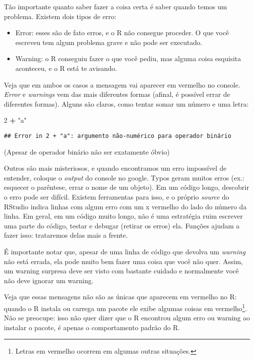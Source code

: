 \documentclass[
]{book}
\newenvironment{Shaded}{\begin{snugshade}}{\end{snugshade}}
\newcommand{\DecValTok}[1]{\textcolor[rgb]{0.00,0.00,0.81}{#1}}
\newcommand{\OperatorTok}[1]{\textcolor[rgb]{0.81,0.36,0.00}{\textbf{#1}}}
\newcommand{\StringTok}[1]{\textcolor[rgb]{0.31,0.60,0.02}{#1}}
\providecommand{\tightlist}{%
  \setlength{\itemsep}{0pt}\setlength{\parskip}{0pt}}
\begin{document}
Tão importante quanto saber fazer a coisa certa é saber quando temos um problema. Existem dois tipos de erro:

\begin{itemize}
\tightlist
\item
  Error: esses são de fato erros, e o R não consegue proceder. O que você escreveu tem algum problema grave e não pode ser executado.
\item
  Warning: o R conseguiu fazer o que você pediu, mas alguma coisa esquisita aconteceu, e o R está te avisando.
\end{itemize}

Veja que em ambos os casos a mensagem vai aparecer em vermelho no console. \emph{Error} e \emph{warnings} vem das mais diferentes formas (afinal, é possível errar de diferentes formas). Alguns são claros, como tentar somar um número e uma letra:

\begin{Shaded}
\begin{Highlighting}[]
\DecValTok{2} \OperatorTok{+}\StringTok{ "a"}
\end{Highlighting}
\end{Shaded}

\begin{verbatim}
## Error in 2 + "a": argumento não-numérico para operador binário
\end{verbatim}

(Apesar de operador binário não ser exatamente óbvio)

Outros são mais misteriosos, e quando encontramos um erro impossível de entender, coloque o \emph{output} do console no google. Typos geram muitos erros (ex.: esquecer o parêntese, errar o nome de um objeto). Em um código longo, descobrir o erro pode ser difícil. Existem ferramentas para isso, e o próprio \emph{source} do RStudio indica linhas com algum erro com um x vermelho do lado do número da linha. Em geral, em um código muito longo, não é uma estratégia ruim escrever uma parte do código, testar e debugar (retirar os erros) ela. Funções ajudam a fazer isso: trataremos delas mais a frente.

É importante notar que, apesar de uma linha de código que devolva um \emph{warning} não está errada, ela pode muito bem fazer uma coisa que você não quer. Assim, um warning surpresa deve ser visto com bastante cuidado e normalmente você não deve ignorar um warning.

Veja que essas mensagens não são as únicas que aparecem em vermelho no R: quando o R instala ou carrega um pacote ele exibe algumas coisas em vermelho\footnote{Letras em vermelho ocorrem em algumas outras situações.}. Não se preocupe: isso não quer dizer que o R encontrou algum erro ou warning ao instalar o pacote, é apenas o comportamento padrão do R.
\end{document}
